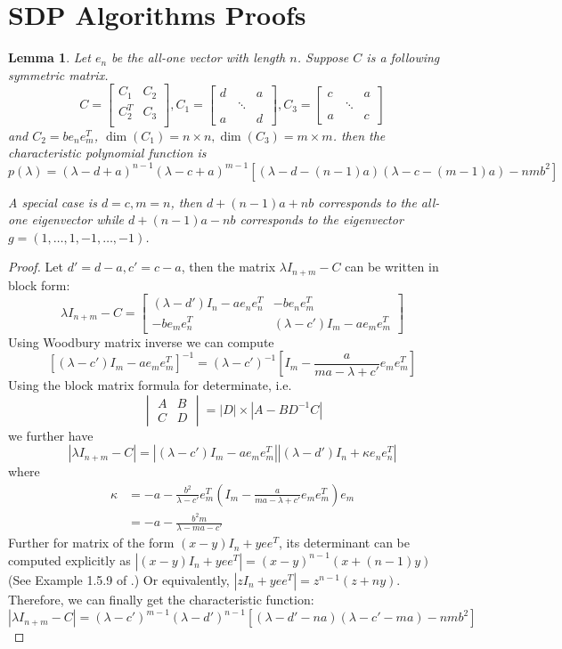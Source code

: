 \documentclass{ctexart}
\newtheorem{lemma}{Lemma}
\begin{document}
	\section{SDP Algorithms Proofs}
\begin{lemma}\label{lem:Cabd}
	Let $e_n$ be the all-one vector with length $n$.
	Suppose $C$ is a following symmetric matrix.
	$$
	C= \begin{bmatrix}
C_1 & C_2 \\
C_2^T & C_3 \\
\end{bmatrix},	
C_1=
\begin{bmatrix} d & \text{ } &  a \\
\text{ } & \ddots & \text{ } \\
a & \text{ } & d 
\end{bmatrix},
C_3=
\begin{bmatrix} c & \text{ } &  a \\
\text{ } & \ddots & \text{ } \\
a & \text{ } & c
\end{bmatrix}
$$
and $C_2 = b e_n e_m^T$, $\dim(C_1) = n \times n, \dim(C_3) = m \times m$.
then the characteristic polynomial function is
$$
p(\lambda) = 
(\lambda - d + a)^{n-1} (\lambda - c + a)^{m-1}
[(\lambda - d - (n-1)a)
 (\lambda - c - (m-1)a)
- nmb^2]
$$
 
 A special case is $d=c,m=n$, then $d + (n-1)a+ nb$ corresponds to the all-one eigenvector while 
 $d +(n-1)a -nb$ corresponds to the eigenvector $g=(1,\dots, 1, -1, \dots, -1)$.
\end{lemma}
\begin{proof}
Let $d' = d-a, c'=c-a$,
then the matrix $\lambda I_{n+m} - C$ can be written in block form:
$$
\lambda I_{n+m} - C = \begin{bmatrix}
(\lambda -d') I_n - a e_ne_n^T & -b e_ne_m^T \\
-be_me_n^T & (\lambda -c') I_m - a e_me_m^T
\end{bmatrix}
$$
Using Woodbury matrix inverse we can compute
$$
[(\lambda -c') I_m - a e_me_m^T]^{-1} = (\lambda - c')^{-1} [I_m - \frac{a}{ma - \lambda + c'} e_me_m^T]
$$
Using the block matrix formula for determinate, i.e.
$$
\begin{vmatrix}
A & B \\
C & D
\end{vmatrix} = |D| \times |A-BD^{-1}C|
$$
we further have
$$
|\lambda I_{n+m} - C| = |(\lambda -c') I_m - a e_me_m^T| |(\lambda - d')I_n + \kappa e_ne_n^T|
$$
where
\begin{align*}
\kappa &= -a - \frac{b^2}{\lambda - c'} e_m^T (I_m - \frac{a}{ma-\lambda + c'}e_me_m^T)e_m \\
&= -a  - \frac{b^2 m}{\lambda - ma - c'}
\end{align*}
Further for matrix of the form $(x-y)I_n + yee^T$, its determinant can be computed explicitly
as $|(x-y)I_n + yee^T|=(x-y)^{n-1}(x+(n-1)y)$ (See Example 1.5.9 of \cite{ad_li}.)
Or equivalently, $|zI_n + yee^T|=z^{n-1}(z+ny)$.
Therefore, we can finally get the characteristic function:
$$
|\lambda I_{n+m} - C| = (\lambda -c')^{m-1}(\lambda -d')^{n-1}  [(\lambda - d' - na)(\lambda - c' - ma)-nmb^2]
$$
\end{proof}
\end{document}
